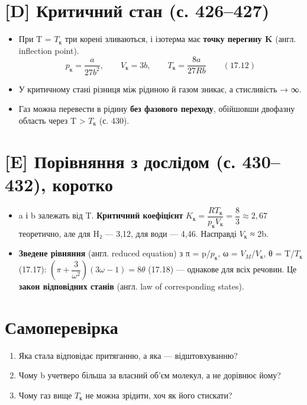 \documentclass[11pt,a4paper,oneside]{book}
\begin{document}
\section*{[D] Критичний стан (с. 426–427)}
\begin{itemize}
\item При T = $T_{\text{к}}$ три корені зливаються, і ізотерма має \textbf{точку перегину K} (англ. inflection point).
\[p_\text{к} = \frac a{27b^2},\qquad V_\text{к} = 3b,\qquad T_\text{к} = \frac{8a}{27Rb}\qquad(17.12)\]
\item У критичному стані різниця між рідиною й газом зникає, а стисливість → ∞.
\item Газ можна перевести в рідину \textbf{без фазового переходу}, обійшовши двофазну область через T > $T_{\text{к}}$ (с. 430).
\end{itemize}

\section*{[E] Порівняння з дослідом (с. 430–432), коротко}
\begin{itemize}
\item a і b залежать від T. \textbf{Критичний коефіцієнт} $K_\text{к} = \dfrac{RT_\text{к}}{p_\text{к}V_\text{к}} = \dfrac83 \approx 2{,}67$ теоретично, але для H₂ — 3,12, для води — 4,46. Насправді $V_{\text{к}}$ ≈ 2b.
\item \textbf{Зведене рівняння} (англ. reduced equation) з π = p/$p_{\text{к}}$, ω = $V_{M}$/$V_{\text{к}}$, θ = T/$T_{\text{к}}$ (17.17): $\left(\pi + \dfrac3{\omega^2}\right)(3\omega - 1) = 8\theta$ (17.18) — однакове для всіх речовин. Це \textbf{закон відповідних станів} (англ. law of corresponding states).
\end{itemize}

\section*{Самоперевірка}
\begin{enumerate}
\item Яка стала відповідає притяганню, а яка — відштовхуванню?
\item Чому b учетверо більша за власний об'єм молекул, а не дорівнює йому?
\item Чому газ вище $T_{\text{к}}$ не можна зрідити, хоч як його стискати?
\end{enumerate}
\end{document}
